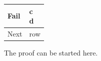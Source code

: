 \documentclass{article}
\begin{document}
\begin{tabular}{|p{2cm}|p{5cm}|}
Fail & \inferrule{a \\ b}{c \\ d} \\
\hline
Next & row \\
\end{tabular}

The proof can be started here.
\end{document}
